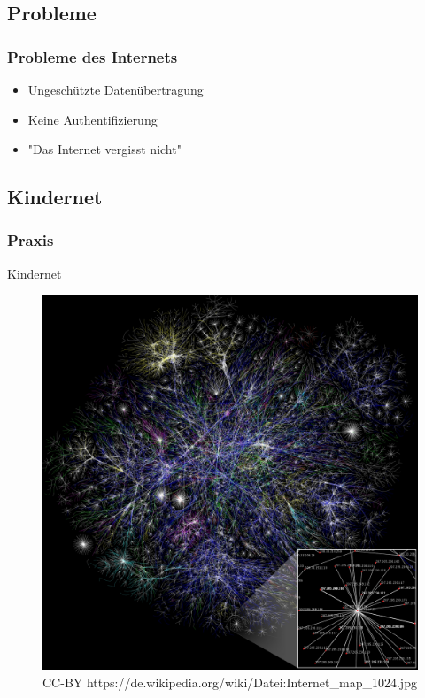 \documentclass{beamer}
\begin{document}
\subsection{Probleme}

\begin{frame}
  \frametitle{Probleme des Internets}
  \begin{itemize}
    \item<1-> Ungeschützte Datenübertragung
    \item<2-> Keine Authentifizierung
    \item<3-> "Das Internet vergisst nicht"
  \end{itemize}
\end{frame}

\subsection{Kindernet}

\begin{frame}
  \frametitle{Praxis}
  Kindernet
  \begin{figure}
      \includegraphics{img/internet_map.jpg}
      \caption{CC-BY https://de.wikipedia.org/wiki/Datei:Internet_map_1024.jpg}
  \end{figure}
\end{frame}
\end{document}

